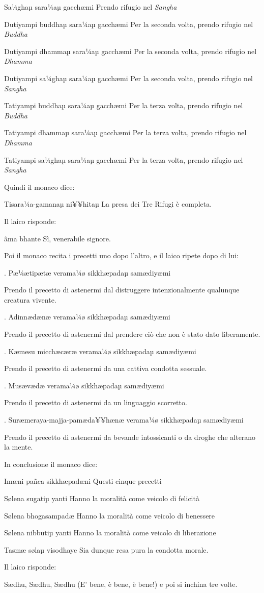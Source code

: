 Sa¼ghaµ sara¼aµ gacchæmi Prendo rifugio nel \textit{Sangha}

Dutiyampi buddhaµ sara¼aµ gacchæmi Per la seconda volta, prendo rifugio
nel \textit{Buddha}

Dutiyampi dhammaµ sara¼aµ gacchæmi Per la seconda volta, prendo rifugio
nel \textit{Dhamma}

Dutiyampi sa¼ghaµ sara¼aµ gacchæmi Per la seconda volta, prendo rifugio
nel \textit{Sangha}

Tatiyampi buddhaµ sara¼aµ gacchæmi Per la terza volta, prendo rifugio
nel \textit{Buddha}

Tatiyampi dhammaµ sara¼aµ gacchæmi Per la terza volta, prendo rifugio
nel \textit{Dhamma}

Tatiyampi sa¼ghaµ sara¼aµ gacchæmi Per la terza volta, prendo rifugio
nel \textit{Sangha}

Quindi il monaco dice:

Tisara¼a-gamanaµ ni¥¥hitaµ La presa dei Tre Rifugi è completa.

Il laico risponde:

âma bhante Sì, venerabile signore.

Poi il monaco recita i precetti uno dopo l'altro, e il laico ripete dopo
di lui:

\1. Pæ¼ætipætæ verama¼ø sikkhæpadaµ samædiyæmi

Prendo il precetto di astenermi dal distruggere intenzionalmente
qualunque creatura vivente.

\2. Adinnædænæ verama¼ø sikkhæpadaµ samædiyæmi

Prendo il precetto di astenermi dal prendere ciò che non è stato dato
liberamente.

\3. Kæmesu micchæcæræ verama¼ø sikkhæpadaµ samædiyæmi

Prendo il precetto di astenermi da una cattiva condotta sessuale.

\4. Musævædæ verama¼ø sikkhæpadaµ samædiyæmi

Prendo il precetto di astenermi da un linguaggio scorretto.

\5. Suræmeraya-majja-pamæda¥¥hænæ verama¼ø sikkhæpadaµ samædiyæmi

Prendo il precetto di astenermi da bevande intossicanti o da droghe che
alterano la mente.

In conclusione il monaco dice:

Imæni pañca sikkhæpadæni Questi cinque precetti

Sølena sugatiµ yanti Hanno la moralità come veicolo di felicità

Sølena bhogasampadæ Hanno la moralità come veicolo di benessere

Sølena nibbutiµ yanti Hanno la moralità come veicolo di liberazione

Tasmæ sølaµ visodhaye Sia dunque resa pura la condotta morale.

Il laico risponde:

Sædhu, Sædhu, Sædhu (E' bene, è bene, è bene!) e poi si inchina tre
volte.
